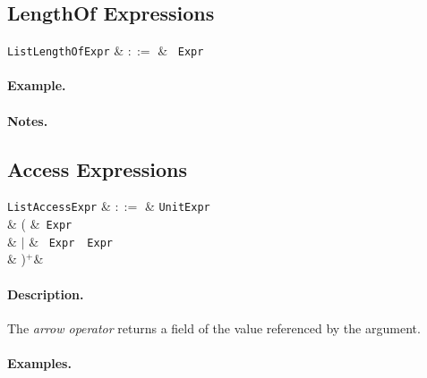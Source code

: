 
\subsection{LengthOf Expressions}
\label{c_expr_lengthof}

\begin{syntax}
\verb+ListLengthOfExpr+ & $::=$ & \token{|}\ \verb+Expr+\ \token{|}\\
\end{syntax}

\paragraph{Example.}

\paragraph{Notes.}


\subsection{Access Expressions}
\label{c_expr_list_access}

\begin{syntax}
  \verb+ListAccessExpr+ & $::=$ & \verb+UnitExpr+\\
   &  \big( &\token{[}\ \verb+Expr+\ \token{]}\\
   & $|$ & \token{[}\ \verb+Expr+\ \ \verb+Expr+\ \token{]}\\
   & \big)$^+$&\\
\end{syntax}

\paragraph{Description.}

The {\em arrow operator} returns a field of the value referenced by the argument.

\paragraph{Examples.}

